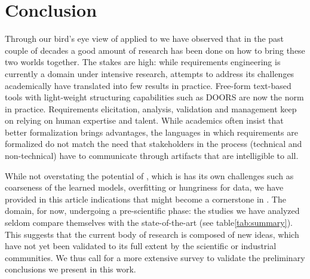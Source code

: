 \section{Conclusion}
\label{sec:conclusion}

Through our bird's eye view of \ML applied to \RE we have observed that in the
past couple of decades a good amount of research has been done on how to bring
these two worlds together. The stakes are high: while requirements engineering
is currently a domain under intensive research, attempts to address its
challenges academically have translated into few results in practice. Free-form
text-based tools with light-weight structuring capabilities such as DOORS are
now the norm in practice. Requirements elicitation, analysis, validation and
management keep on relying on human expertise and talent. While academics often insist that
better formalization brings advantages, the languages in which requirements are
formalized do not match the need that stakeholders in the \RE process
(technical and non-technical) have to communicate through artifacts that are
intelligible to all.

While not overstating the potential of \ML, which is has its own challenges such
as coarseness of the learned models, overfitting or hungriness for data, we have
provided in this article indications that \ML might become a cornerstone in \RE.
The domain, for now,  undergoing a pre-scientific phase: the studies we have
analyzed seldom compare themselves with the state-of-the-art (see
table\ref{tab:summary}). This suggests that the current body of research is
composed of new ideas, which have not yet been validated to its full extent by
the scientific or industrial communities. We thus call for a more extensive
survey to validate the preliminary conclusions we present in this work.
